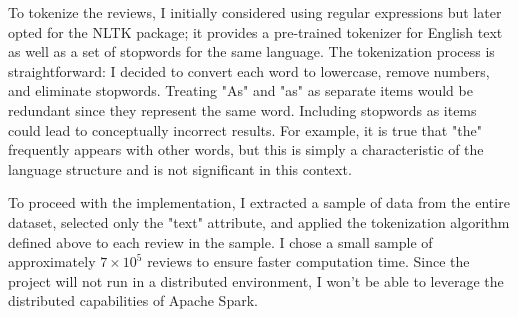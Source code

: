 To tokenize the reviews, I initially considered using regular expressions but later opted for the NLTK package; it provides a pre-trained tokenizer for English text as well as a set of stopwords for the same language. The tokenization process is straightforward: I decided to convert each word to lowercase, remove numbers, and eliminate stopwords. Treating "As" and "as" as separate items would be redundant since they represent the same word. Including stopwords as items could lead to conceptually incorrect results. For example, it is true that "the" frequently appears with other words, but this is simply a characteristic of the language structure and is not significant in this context.

To proceed with the implementation, I extracted a sample of data from the entire dataset, selected only the "text" attribute, and applied the tokenization algorithm defined above to each review in the sample. I chose a small sample of approximately $7 \times 10^5$ reviews to ensure faster computation time. Since the project will not run in a distributed environment, I won't be able to leverage the distributed capabilities of Apache Spark.